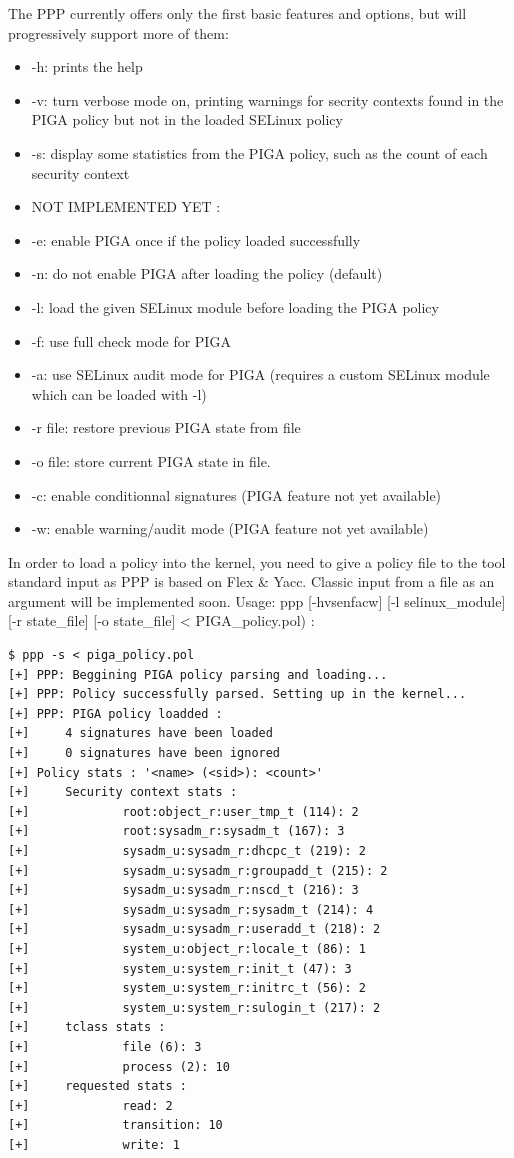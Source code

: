 \documentclass[pdftex,a4paper,titlepage,11pt]{article}
\begin{document}
The PPP currently offers only the first basic features and options, but will progressively support more of them:
\begin{itemize}
	\item -h: prints the help
	\item -v: turn verbose mode on, printing warnings for secrity contexts found in the PIGA policy but not in the loaded SELinux policy
	\item -s: display some statistics from the PIGA policy, such as the count of each security context
	\item NOT IMPLEMENTED YET :
	\item -e: enable PIGA once if the policy loaded successfully
	\item -n: do not enable PIGA after loading the policy (default)
	\item -l: load the given SELinux module before loading the PIGA policy
	\item -f: use full check mode for PIGA
	\item -a: use SELinux audit mode for PIGA (requires a custom SELinux module which can be loaded with -l)
	\item -r file: restore previous PIGA state from file
	\item -o file: store current PIGA state in file.
	\item -c: enable conditionnal signatures (PIGA feature not yet available)
	\item -w: enable warning/audit mode (PIGA feature not yet available)
\end{itemize}

\smallskip

In order to load a policy into the kernel, you need to give a policy file to the tool standard input as PPP is based on Flex \& Yacc. Classic input from a file as an argument will be implemented soon. Usage: ppp [-hvsenfacw] [-l selinux\_module] [-r state\_file] [-o state\_file] < PIGA\_policy.pol) :

\begin{lstlisting}
$ ppp -s < piga_policy.pol
[+] PPP: Beggining PIGA policy parsing and loading...
[+] PPP: Policy successfully parsed. Setting up in the kernel...
[+] PPP: PIGA policy loadded :
[+]     4 signatures have been loaded
[+]     0 signatures have been ignored
[+] Policy stats : '<name> (<sid>): <count>'
[+]     Security context stats :
[+]             root:object_r:user_tmp_t (114): 2
[+]             root:sysadm_r:sysadm_t (167): 3
[+]             sysadm_u:sysadm_r:dhcpc_t (219): 2
[+]             sysadm_u:sysadm_r:groupadd_t (215): 2
[+]             sysadm_u:sysadm_r:nscd_t (216): 3
[+]             sysadm_u:sysadm_r:sysadm_t (214): 4
[+]             sysadm_u:sysadm_r:useradd_t (218): 2
[+]             system_u:object_r:locale_t (86): 1
[+]             system_u:system_r:init_t (47): 3
[+]             system_u:system_r:initrc_t (56): 2
[+]             system_u:system_r:sulogin_t (217): 2
[+]     tclass stats :
[+]             file (6): 3
[+]             process (2): 10
[+]     requested stats :
[+]             read: 2
[+]             transition: 10
[+]             write: 1
\end{lstlisting}
\end{document}
